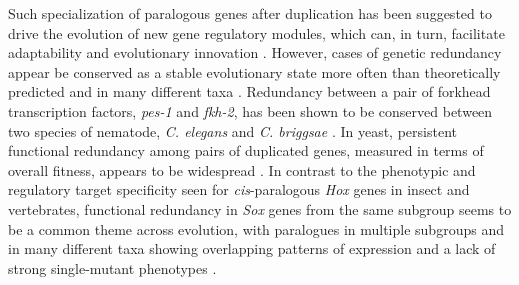 Such specialization of paralogous genes after duplication has been suggested to drive the evolution of new gene regulatory modules, which can, in turn, facilitate adaptability and evolutionary innovation \citep{espinosa-soto_specialization_2010}. However, cases of genetic redundancy appear be conserved as a stable evolutionary state more often than theoretically predicted and in many different taxa \citep{lynch_probability_2001,vavouri_widespread_????}. Redundancy between a pair of forkhead transcription factors, \emph{pes-1} and \emph{fkh-2}, has been shown to be conserved between two species of nematode, \emph{C. elegans} and \emph{C. briggsae} \citep{molin_evolutionary_2000}. In yeast, persistent functional redundancy among pairs of duplicated genes, measured in terms of overall fitness, appears to be widespread \citep{dean_pervasive_2008}. In contrast to the phenotypic and regulatory target specificity seen for \emph{cis}-paralogous \emph{Hox} genes in insect and vertebrates, functional redundancy in \emph{Sox} genes from the same subgroup seems to be a common theme across evolution, with paralogues in multiple subgroups and in many different taxa showing overlapping patterns of expression and a lack of strong single-mutant phenotypes \citep{bhattaram_organogenesis_2010,buescher_formation_2002,ferri_sox2_2004,guth_having_2008,matsui_redundant_2006,nishiguchi_sox1_1998,okuda_b1_2010,overton_evidence_2002,rizzoti_sox3_2004,uchikawa_b1_2011,uwanogho_embryonic_1995-1,wegner_stem_2005,wood_comparative_1999-1}.\\ 

